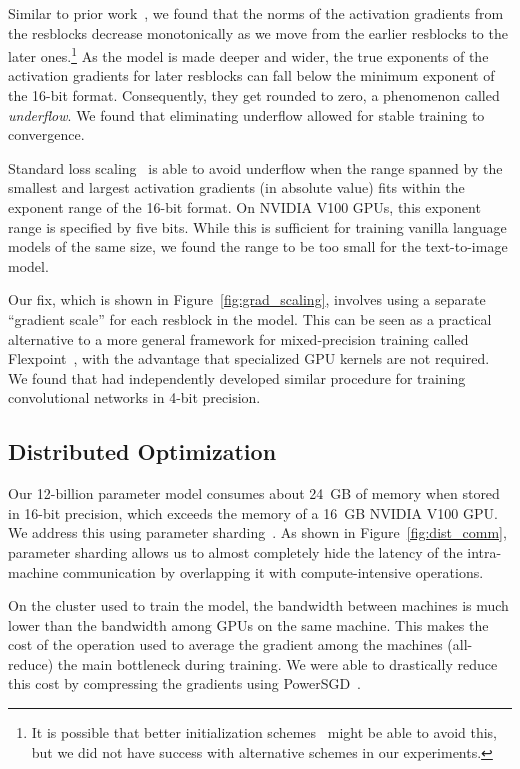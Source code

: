 Similar to prior work~\cite{liu2020understanding}, we found that the norms of the activation gradients from the resblocks decrease monotonically as we move from the earlier resblocks to the later ones.\footnote{It is possible that better initialization schemes~\cite{liu2020understanding} might be able to avoid this, but we did not have success with alternative schemes in our experiments.} As the model is made deeper and wider, the true exponents of the activation gradients for later resblocks can fall below the minimum exponent of the 16-bit format. Consequently, they get rounded to zero, a phenomenon called \emph{underflow}. We found that eliminating underflow allowed for stable training to convergence.

Standard loss scaling~\cite{micikevicius2017mixed} is able to avoid underflow when the range spanned by the smallest and largest activation gradients (in absolute value) fits within the exponent range of the 16-bit format. On NVIDIA V100 GPUs, this exponent range is specified by five bits. While this is sufficient for training vanilla language models of the same size, we found the range to be too small for the text-to-image model.

Our fix, which is shown in Figure~\ref{fig:grad_scaling}, involves using a separate ``gradient scale'' for each resblock in the model. This can be seen as a practical alternative to a more general framework for mixed-precision training called Flexpoint~\cite{koster2017flexpoint}, with the advantage that specialized GPU kernels are not required. We found that \citet{sun2020ultra} had independently developed similar procedure for training convolutional networks in 4-bit precision.

\subsection{Distributed Optimization}
\label{sec:dist_opt}

Our 12-billion parameter model consumes about 24~GB of memory when stored in 16-bit precision, which exceeds the memory of a 16~GB NVIDIA V100 GPU. We address this using parameter sharding~\cite{rajbhandari2019zero}. As shown in Figure~\ref{fig:dist_comm}, parameter sharding allows us to almost completely hide the latency of the intra-machine communication by overlapping it with compute-intensive operations.

On the cluster used to train the model, the bandwidth between machines is much lower than the bandwidth among GPUs on the same machine. This makes the cost of the operation used to average the gradient among the machines (all-reduce) the main bottleneck during training. We were able to drastically reduce this cost by compressing the gradients using PowerSGD~\cite{vogels2019powersgd}.

